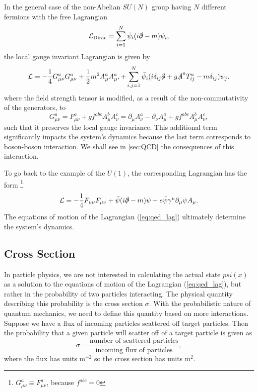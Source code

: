 In the general case of the non-Abelian $SU(N)$ group having $N$ different fermions with the free Lagrangian
\begin{equation}
    \label{eq:Dirac_N}
    \mathcal{L}_{\text{Dirac}} = \sum_{i=1}^N \bar{\psi}_i (i\slashed{\partial} - m) \psi_i,
\end{equation}
the local gauge invariant Lagrangian is given by \cite{schartz}
\begin{equation}
    \label{eq:lag_suN}
    \mathcal{L} = - \frac{1}{4}  G^a_{\mu\nu} G^a_{\mu\nu} + \frac{1}{2} m^2 A^a_\mu A^a_\mu, + \sum_{i,j=1}^N \bar{\psi}_i (i\delta_{ij} \slashed{\partial}  +g \slashed{A}^a T^a_{ij} - m \delta_{ij}) \psi_j.
\end{equation}
where the field strength tensor is modified, as a result of the non-commutativity of the generators, to
\begin{equation}
    \label{eq:field_strength}
    G^a_{\mu\nu} = F^a_{\mu\nu} + g f^{abc} A^b_\mu A^c_\nu = \partial_\mu A^a_\nu - \partial_\nu A^a_\mu + g f^{abc} A^b_\mu A^c_\nu,
\end{equation}
such that it preserves the local gauge invariance.
This additional term significantly impacts the system's dynamics because the last term corresponds to boson-boson interaction.
We shall see in \cref{sec:QCD} the consequences of this interaction.

To go back to the example of the $U(1)$, the corresponding Lagrangian has the form \footnote{$G^a_{\mu\nu} \equiv F^a_{\mu\nu}$, because $f^{abc} = 0$}
\begin{equation}
    \label{eq:qed_lag}
    \mathcal{L} = - \frac{1}{4}  F_{\mu\nu} F_{\mu\nu} + \bar{\psi}(i\slashed{\partial} - m) \psi - e \bar{\psi} \gamma^\mu \partial_\mu \psi A_\mu.
\end{equation}
The equations of motion of the Lagrangian (\ref{eq:qed_lag}) ultimately determine the system's dynamics.

\subsection{Cross Section}
\label{sec:cross_section}
In particle physics, we are not interested in calculating the actual state $psi(x)$ as a solution to the equations of motion of the Lagrangian (\ref{eq:qed_lag}), but rather in the probability of two particles interacting. 
The physical quantity describing this probability is the cross section $\sigma$.
With the probabilistic nature of quantum mechanics, we need to define this quantity based on more interactions.
Suppose we have a flux of incoming particles scattered off target particles. 
Then the probability that a given particle will scatter off of a target particle is given as 
\begin{equation}
    \label{eq:cross_sec}
    \sigma = \frac{\text{number of scattered particles}}{\text{incoming flux of particles}},
\end{equation}
where the flux has units m$^{-2}$ so the cross section has units m$^{2}$.

